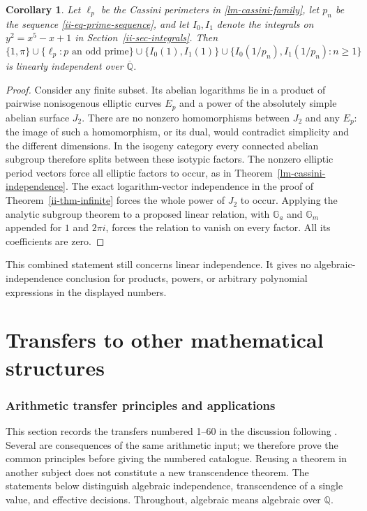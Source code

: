 \documentclass[11pt,a4paper]{article}
\newtheorem{corollary}[theorem]{Corollary}
\theoremstyle{definition}
\theoremstyle{remark}
\numberwithin{equation}{section}
\newcommand{\Qbar}{\overline{\mathbb Q}}
\begin{document}
\begin{corollary}\label{joint-independence}
Let $\ell_p$ be the Cassini perimeters in
\eqref{lm-cassini-family}, let $p_n$ be the sequence
\eqref{ii-eq-prime-sequence}, and let $I_0,I_1$ denote the integrals
on $y^2=x^5-x+1$ in Section~\ref{ii-sec-integrals}.
Then
\[
 \{1,\pi\}\cup\{\ell_p:p\text{ an odd prime}\}
 \cup\{I_0(1),I_1(1)\}
 \cup\{I_0(1/p_n),I_1(1/p_n):n\ge1\}
\]
is linearly independent over $\Qbar$.
\end{corollary}
\begin{proof}
Consider any finite subset. Its abelian logarithms lie in a product
of pairwise nonisogenous elliptic curves $E_p$ and a power of the
absolutely simple abelian surface $J_2$. There are no nonzero
homomorphisms between $J_2$ and any $E_p$: the image of such a
homomorphism, or its dual, would contradict simplicity and the
different dimensions. In the isogeny category every connected
abelian subgroup therefore splits between these isotypic factors.
The nonzero elliptic period vectors force all elliptic factors to
occur, as in Theorem~\ref{lm-cassini-independence}. The exact
logarithm-vector independence in the proof of
Theorem~\ref{ii-thm-infinite} forces the whole power of $J_2$ to
occur. Applying the analytic subgroup theorem to a proposed linear
relation, with $\mathbb G_a$ and $\mathbb G_m$ appended for $1$ and
$2\pi i$, forces the relation to vanish on every factor. All its
coefficients are zero.
\end{proof}

This combined statement still concerns linear independence. It gives no
algebraic-independence conclusion for products, powers, or arbitrary
polynomial expressions in the displayed numbers.


\part{Transfers to other mathematical structures}

\section{Arithmetic transfer principles and applications}
\label{tf-section}

This section records the transfers numbered 1--60 in the discussion following
\cite{tf-baseline}.  Several are consequences of the same arithmetic input;
we therefore prove the common principles before giving the numbered
catalogue.  Reusing a theorem in another subject does not constitute a new
transcendence theorem.  The statements below distinguish algebraic
independence, transcendence of a single value, and effective decisions.
Throughout, algebraic means algebraic over $\mathbb Q$.
\end{document}
